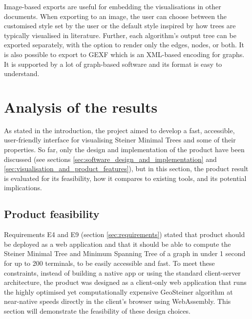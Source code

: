 \documentclass{l4proj}
\begin{document}
Image-based exports are useful for embedding the visualisations in other documents.
When exporting to an image, the user can choose between the customised style set by the user or the default style inspired by how trees are typically visualised in literature. Further, each algorithm's output tree can be exported separately, with the option to render only the edges, nodes, or both.
It is also possible to export to GEXF which is an XML-based encoding for graphs. It is supported by a lot of graph-based software and its format is easy to understand.




\chapter{Analysis of the results}
\label{sec:analysis_results}
As stated in the introduction, the project aimed to develop a fast, accessible, user-friendly interface for visualising Steiner Minimal Trees and some of their properties.
So far, only the design and implementation of the product have been discussed (see sections \ref{sec:software_design_and_implementation} and \ref{sec:visualisation_and_product_features}), but in this section, the product result is evaluated for its feasibility, how it compares to existing tools, and its potential implications.

\section{Product feasibility}
Requirements E4 and E9 (section \ref{sec:requirements}) stated that product should be deployed as a web application and that it should be able to compute the Steiner Minimal Tree and Minimum Spanning Tree of a graph in under 1 second for up to 200 terminals, to be easily accessible and fast. To meet these constraints, instead of building a native app or using the standard client-server architecture, the product was designed as a client-only web application that runs the highly optimised yet computationally expensive GeoSteiner algorithm at near-native speeds directly in the client's browser using WebAssembly.
This section will demonstrate the feasibility of these design choices.
\end{document}

